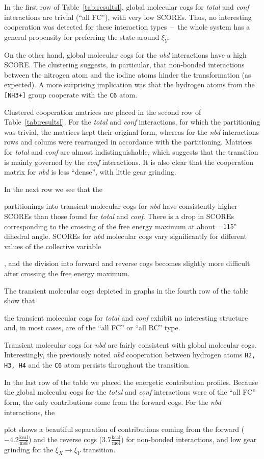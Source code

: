\documentclass[a4paper,11pt,twoside]{book}%
\begin{document}
In the first row of Table~\ref{tab:resultsI}, global molecular cogs for \emph{total} and \emph{conf} interactions are trivial (``all FC''){\color{black}, with very low SCOREs.
Thus, }no interesting cooperation was detected for these interaction types~--~the whole system has a general propensity for preferring the state around $\xi_Y$.   
{\color{black} On the other hand, global molecular cogs for the \emph{nbd} interactions have a high SCORE.
The clustering suggests, in particular, that non-bonded interactions between the nitrogen atom and the iodine atoms hinder the transformation (as expected).
A more surprising implication was that the hydrogen atoms from the \texttt{[NH3+]} group cooperate with the \texttt{C6} atom.

Clustered cooperation matrices are placed in the second row of Table~\ref{tab:resultsI}.
For the \emph{total} and \emph{conf} interactions, for which the partitioning was trivial, the matrices kept their original form, whereas for the \emph{nbd} interactions rows and colums were rearranged in accordance with the partitioning.
Matrices for \emph{total} and \emph{conf} are almost indistinguishable, which suggests that the transition is mainly governed by the \emph{conf} interactions.
It is also clear that the cooperation matrix for \emph{nbd} is less ``dense'', with little gear grinding.

In the next row we see that the} partitionings into transient molecular cogs for \emph{nbd} have consistently higher SCOREs than those found for \emph{total} and \emph{conf}.
There is a drop in SCOREs corresponding to the crossing of the free energy {\color{black}maximum} at about $-115\degree$ dihedral angle.
SCOREs for \emph{nbd} molecular cogs vary significantly for different values of the collective variable{\color{black}, and the division into forward and reverse cogs becomes slightly more difficult after crossing the free energy maximum.

The transient molecular cogs depicted in graphs in the fourth row of the table show that} the transient molecular cogs for \emph{total} and \emph{conf} exhibit no interesting structure and, in most cases, are of the ``all FC'' or ``all RC'' type.
{\color{black}Transient molecular cogs for \emph{nbd} are fairly consistent with global molecular cogs.
Interestingly, the previously noted \emph{nbd} cooperation between hydrogen atoms \texttt{H2, H3, H4} and the \texttt{C6} atom persists throughout the transition.

In the last row of the table we placed the energetic contribution profiles.
Because the global molecular cogs for the \emph{total} and \emph{conf} interactions were of the ``all FC'' form, {\color{black}the only contributions come from the forward cogs.}
For the \emph{nbd} interactions, the }plot shows a beautiful separation of contributions coming from the forward ($-4.2\frac{\text{kcal}}{\text{mol}}$) and the reverse cogs ($3.7\frac{\text{kcal}}{\text{mol}}$) for non-bonded interactions, and low gear grinding for the $\xi_X\to\xi_Y$ transition.
\end{document}
